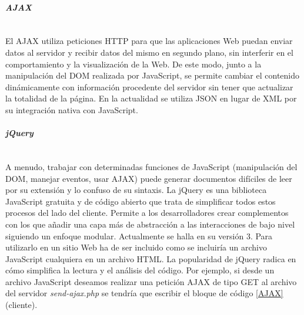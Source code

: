 \paragraph{\emph{AJAX}} ~\\

El AJAX utiliza peticiones HTTP para que las aplicaciones Web puedan enviar datos al servidor y recibir datos del mismo en segundo plano, sin interferir en el comportamiento y la visualización de la Web. De este modo, junto a la manipulación del DOM realizada por JavaScript, se permite cambiar el contenido dinámicamente con información procedente del servidor sin tener que actualizar la totalidad de la página. En la actualidad se utiliza JSON en lugar de XML por su integración nativa con JavaScript.

\paragraph{\emph{jQuery}} ~\\

A menudo, trabajar con determinadas funciones de JavaScript (manipulación del DOM, manejar eventos, usar AJAX) puede generar documentos difíciles de leer por su extensión y lo confuso de su sintaxis. La jQuery es una biblioteca JavaScript gratuita y de código abierto que trata de simplificar todos estos procesos del lado del cliente. Permite a los desarrolladores crear complementos con los que añadir una capa más de abstracción a las interacciones de bajo nivel siguiendo un enfoque modular. Actualmente se halla en su versión 3. Para utilizarlo en un sitio Web ha de ser incluido como se incluiría un archivo JavaScript cualquiera en un archivo HTML. La popularidad de jQuery radica en cómo simplifica la lectura y el análisis del código. Por ejemplo, si desde un archivo JavaScript deseamos realizar una petición AJAX de tipo GET al archivo del servidor \emph{send-ajax.php} se tendría que escribir el bloque de código \ref{AJAX} (cliente).


